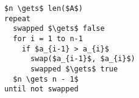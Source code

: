 \begin{lstlisting}[style = code]
$n \gets$ len($A$)
repeat
  swapped $\gets$ false
  for i = 1 to n-1
    if $a_{i-1} > a_{i}$
      swap($a_{i-1}$, $a_{i}$)
      swapped $\gets$ true
  $n \gets n - 1$
until not swapped
\end{lstlisting}
